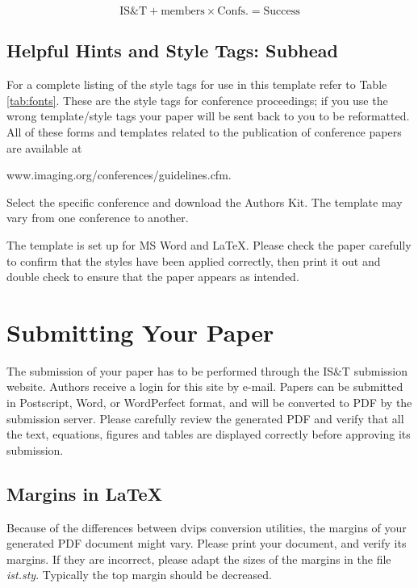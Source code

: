 \documentclass[letterpaper,twocolumn,fleqn]{article}
\begin{document}
\begin{equation}
\label{eq:ist}
\textrm{IS\&T} + \textrm{members} \times \textrm{Confs.} = \textrm{Success}
\end{equation}


\subsection{Helpful Hints and Style Tags: Subhead}
For a complete listing of the style tags for use in this template
refer to Table \ref{tab:fonts}. These are the style tags for
conference proceedings; if you use the wrong template/style tags your
paper will be sent back to you to be reformatted.  All of these forms
and templates related to the publication of conference papers are
available at

www.imaging.org/conferences/guidelines.cfm. 

Select the specific conference and download the Authors Kit. The
template may vary from one conference to another.

The template is set up for MS Word and LaTeX. Please check the paper
carefully to confirm that the styles have been applied correctly, then
print it out and double check to ensure that the paper appears as
intended.

\section{Submitting Your Paper}
The submission of your paper has to be performed through the IS\&T
submission website. Authors receive a login for this site by e-mail.
Papers can be submitted in Postscript, Word, or WordPerfect format,
and will be converted to PDF by the submission server. Please
carefully review the generated PDF and verify that all the text,
equations, figures and tables are displayed correctly before approving
its submission.

\subsection{Margins in LaTeX}
Because of the differences between dvips conversion utilities, the
margins of your generated PDF document might vary. Please print
your document, and verify its margins. If they are incorrect, please
adapt the sizes of the margins in the file \emph{ist.sty}. Typically the
top margin should be decreased.
\end{document}
